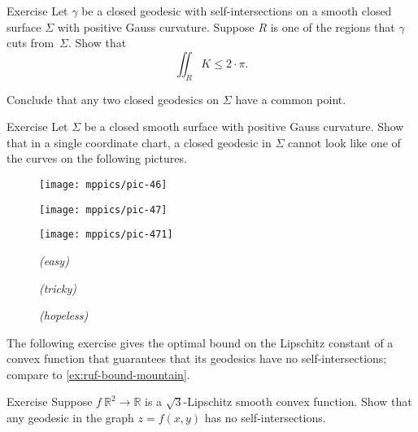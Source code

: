\begin{thm}{Exercise}\label{ex:closed-geodesic}
Let $\gamma$ be a closed geodesic with self-intersections on a smooth closed surface $\Sigma$ with positive Gauss curvature.
Suppose $R$ is one of the regions that $\gamma$ cuts from~$\Sigma$.
Show that 
\[\iint_R K\le 2\cdot\pi.\]

Conclude that any two closed geodesics on $\Sigma$ have a common point.
\end{thm}

\begin{thm}{Exercise}\label{ex:self-intersections}
Let $\Sigma$ be a closed smooth surface with positive Gauss curvature. 
Show that in a single coordinate chart, a closed geodesic in $\Sigma$ cannot look like one of the curves on the following pictures.

\begin{figure}[h]
\begin{minipage}{.32\textwidth}
\centering
\texttt{[image: mppics/pic-46]}
\end{minipage}
\hfill
\begin{minipage}{.32\textwidth}
\centering
\texttt{[image: mppics/pic-47]}
\end{minipage}
\hfill
\begin{minipage}{.32\textwidth}
\centering
\texttt{[image: mppics/pic-471]}
\end{minipage}

\medskip

\begin{minipage}{.32\textwidth}
\centering
\caption*{\textit{(easy)}}
\end{minipage}
\hfill
\begin{minipage}{.32\textwidth}
\centering
\caption*{\textit{(tricky)}}
\end{minipage}
\hfill
\begin{minipage}{.32\textwidth}
\centering
\caption*{\textit{(hopeless)}}
\end{minipage}
\end{figure}

\end{thm}


The following exercise gives the optimal bound on the Lipschitz constant of a convex function that guarantees that its geodesics have no self-intersections;
compare to \ref{ex:ruf-bound-mountain}.

\begin{thm}{Exercise}\label{ex:sqrt(3)}
Suppose $f\:\mathbb{R}^2\to\mathbb{R}$ is a $\sqrt{3}$-Lipschitz smooth convex function.
Show that any geodesic in the graph $z=f(x,y)$ has no self-intersections.
\end{thm}

